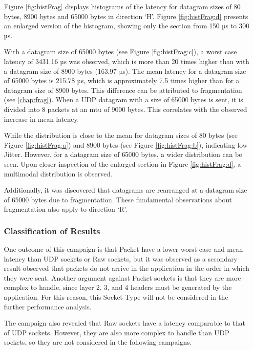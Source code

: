 Figure \ref{fig:histFrag} displays histograms of the latency for datagram sizes of 80 bytes, 8900 bytes and 65000 bytes in direction `H'. Figure \ref{fig:histFrag:d} presents an enlarged version of the histogram, showing only the section from 150 µs to 300 µs.

With a datagram size of 65000 bytes (see Figure \ref{fig:histFrag:c}), a worst case latency of 3431.16 µs was observed, which is more than 20 times higher than with a datagram size of 8900 bytes (163.97 µs). The mean latency for a datagram size of 65000 bytes is 215.78 µs, which is approximately 7.5 times higher than for a datagram size of 8900 bytes. This difference can be attributed to fragmentation (see \ref{chap:frag}). When a UDP datagram with a size of 65000 bytes is sent, it is divided into 8 packets at an \ac{mtu} of 9000 bytes. This correlates with the observed increase in mean latency.

While the distribution is close to the mean for datagram sizes of 80 bytes (see Figure \ref{fig:histFrag:a}) and 8900 bytes (see Figure \ref{fig:histFrag:b}), indicating low Jitter. However, for a datagram size of 65000 bytes, a wider distribution can be seen. Upon closer inspection of the enlarged section in Figure \ref{fig:histFrag:d}, a multimodal distribution is observed.

Additionally, it was discovered that datagrams are rearranged at a datagram size of 65000 bytes due to fragmentation.  These fundamental observations about fragmentation also apply to direction `R'.

\subsubsection{Classification of Results}
One outcome of this campaign is that Packet have a lower worst-case and mean latency than UDP sockets or Raw sockets, but it was observed as a secondary result observed that packets do not arrive in the application in the order in which they were sent. Another argument against Packet sockets is that they are more complex to handle, since layer 2, 3, and 4 headers must be generated by the application. For this reason, this Socket Type will not be considered in the further performance analysis.

The campaign also revealed that Raw sockets have a latency comparable to that of UDP sockets. However, they are also more complex to handle than UDP sockets, so they are not considered in the following campaigns.

